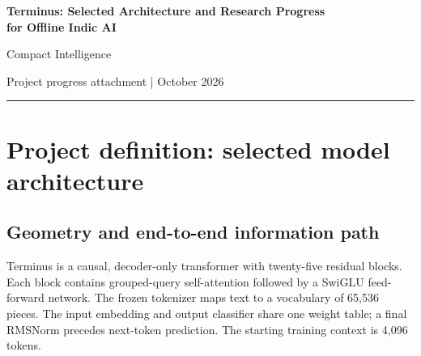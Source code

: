 \documentclass[11pt]{article}
\begin{document}
\begin{center}
{\LARGE\bfseries\color{navy} Terminus: Selected Architecture and Research Progress\\[0.14em]
for Offline Indic AI}\par
\vspace{0.4em}
{\large Compact Intelligence}\par
\vspace{0.15em}
{\color{blue} Project progress attachment \quad | \quad October 2026}
\end{center}
\vspace{0.2em}
{\color{teal}\rule{\linewidth}{1.1pt}}

\begin{abstract}
Terminus is a selected, implemented decoder-only transformer architecture
for a compact language model intended for offline Indic-language assistance.
It has about one and a half billion trainable parameters and combines a
four-local-to-one-global attention cadence, grouped-query attention,
Peri-LN normalization, and a learned cross-layer value residual. The training
design starts with dense weights and FP8 matrix computation, then adapts
eligible projection weights through ternary quantization-aware training.
The program targets \textbf{one trillion valid training-token presentations}
across both stages. Its initial Indic-language set is Hindi, Bengali, Tamil,
Telugu, Kannada, Marathi, and Gujarati. This attachment specifies the
architecture first, then records research progress, intended applications,
and the measurements required before release claims.
\end{abstract}

\section{Project definition: selected model architecture}

\subsection{Geometry and end-to-end information path}

Terminus is a causal, decoder-only transformer with twenty-five residual
blocks. Each block contains grouped-query self-attention followed by a
SwiGLU feed-forward network. The frozen tokenizer maps text to a vocabulary
of 65,536 pieces. The input embedding and output classifier share one
weight table; a final RMSNorm precedes next-token prediction. The starting
training context is 4,096 tokens.
\end{document}
